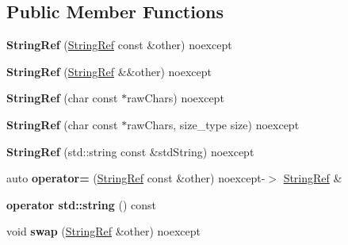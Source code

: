 \subsection*{Public Member Functions}
\begin{DoxyCompactItemize}
\item 
{\bfseries String\+Ref} (\hyperlink{classCatch_1_1StringRef}{String\+Ref} const \&other) noexcept\hypertarget{classCatch_1_1StringRef_a2f287267c3a988b288bfd910667c1cfc}{}\label{classCatch_1_1StringRef_a2f287267c3a988b288bfd910667c1cfc}

\item 
{\bfseries String\+Ref} (\hyperlink{classCatch_1_1StringRef}{String\+Ref} \&\&other) noexcept\hypertarget{classCatch_1_1StringRef_a407d5737b94e5a374add5c2794589733}{}\label{classCatch_1_1StringRef_a407d5737b94e5a374add5c2794589733}

\item 
{\bfseries String\+Ref} (char const $\ast$raw\+Chars) noexcept\hypertarget{classCatch_1_1StringRef_aea45f5089c53adac362bff6bd7c40943}{}\label{classCatch_1_1StringRef_aea45f5089c53adac362bff6bd7c40943}

\item 
{\bfseries String\+Ref} (char const $\ast$raw\+Chars, size\+\_\+type size) noexcept\hypertarget{classCatch_1_1StringRef_a320bf235274ebb90dd6af80485af2797}{}\label{classCatch_1_1StringRef_a320bf235274ebb90dd6af80485af2797}

\item 
{\bfseries String\+Ref} (std\+::string const \&std\+String) noexcept\hypertarget{classCatch_1_1StringRef_a7fe41469048f906e9a847798cd335f23}{}\label{classCatch_1_1StringRef_a7fe41469048f906e9a847798cd335f23}

\item 
auto {\bfseries operator=} (\hyperlink{classCatch_1_1StringRef}{String\+Ref} const \&other) noexcept-\/$>$ \hyperlink{classCatch_1_1StringRef}{String\+Ref} \&\hypertarget{classCatch_1_1StringRef_ac330bd7890310e9cab73a82cdfc1b7f4}{}\label{classCatch_1_1StringRef_ac330bd7890310e9cab73a82cdfc1b7f4}

\item 
{\bfseries operator std\+::string} () const \hypertarget{classCatch_1_1StringRef_a7f38055e84bb8d16e23490b2664bb319}{}\label{classCatch_1_1StringRef_a7f38055e84bb8d16e23490b2664bb319}

\item 
void {\bfseries swap} (\hyperlink{classCatch_1_1StringRef}{String\+Ref} \&other) noexcept\hypertarget{classCatch_1_1StringRef_a8a843e39ad3560d10a80524ed926ed63}{}\label{classCatch_1_1StringRef_a8a843e39ad3560d10a80524ed926ed63}


\end{DoxyCompactItemize}
